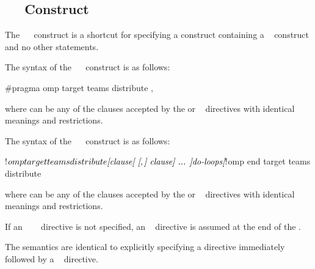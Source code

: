 \subsection{~~ Construct}
\label{subsec:target teams distribute construct}
\summary
The ~~ construct is a shortcut for 
specifying a  construct containing a ~ 
construct and no other statements.

\syntax
\begin{ccppspecific}
The syntax of the ~~ construct is as follows:

\begin{ompcPragma}
#pragma omp target teams distribute \plc{[clause[ [},\plc{] clause] ... ] new-line}
\end{ompcPragma}

where  can be any of the clauses accepted by the  or 
~ directives with identical meanings and restrictions.
\end{ccppspecific}

\begin{fortranspecific}
The syntax of the ~~ construct is as follows:

\begin{ompfPragma}
!$omp target teams distribute \plc{[clause[ [},\plc{] clause] ... ]}
    \plc{do-loops}
\plc{[}!$omp end target teams distribute\plc{]}
\end{ompfPragma}

where  can be any of the clauses accepted by the  
or ~ directives with identical meanings and restrictions.

If an ~~~ directive is not 
specified, an ~   directive 
is assumed at the end of the .
\end{fortranspecific}

\descr
The semantics are identical to explicitly specifying a  directive 
immediately followed by a ~ directive.

